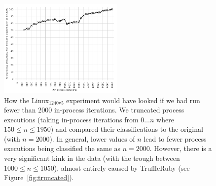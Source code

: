\documentclass[acmsmall]{acmart}\settopmatter{printfolios=true}
\newcommand{\bencherseven}{Linux$_\mathrm{1240v5}$\xspace}
\begin{document}
\begin{figure}[!tbp]
\centering
\includegraphics[width=0.54\textwidth]{examples/truncated_same_plot.pdf}
\caption{How the \bencherseven experiment would have looked if we had run fewer than
2000 in-process iterations. We truncated process
executions (taking in-process iterations from $0 \ldots n$ where $150 \leq n \leq
1950$) and compared their classifications to the original (with $n=2000$).
In general, lower values of $n$ lead to fewer process executions
being classified the same as $n=2000$. However, there is a very significant kink in the
data (with the trough between $1000 \leq n \leq 1050$), almost entirely caused by TruffleRuby (see
Figure~\ref{fig:truncated}).}
\label{fig:sametruncated}
\end{figure}
\end{document}
